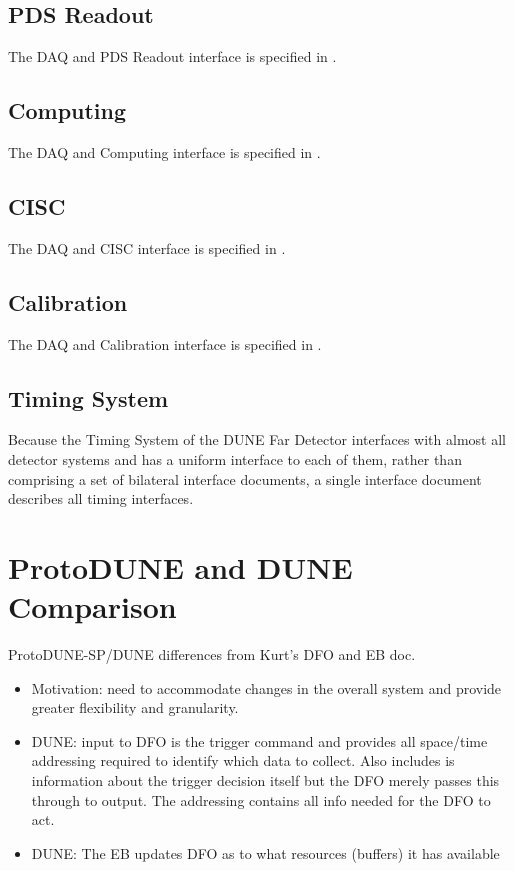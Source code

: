 \subsection{PDS Readout}
The DAQ and PDS Readout interface is specified in \cite{docid-6727}.
\subsection{Computing}
The DAQ and Computing interface is specified in \cite{docid-7123}.
\subsection{CISC}
\label{sec:sp-daq:interfaces-cisc}
The DAQ and CISC interface is specified in \cite{docid-6790}.
\subsection{Calibration}
The DAQ and Calibration interface is specified in \cite{docid-7069}.
\subsection{Timing System}
Because the Timing System of the DUNE Far Detector interfaces with
almost all detector systems and has a uniform interface to each of
them, rather than comprising a set of 
bilateral interface documents, a single interface document
\cite{docid-11224} describes all timing interfaces. 

\section{ProtoDUNE and DUNE Comparison}


ProtoDUNE-SP/DUNE differences from Kurt's DFO and EB doc.
\begin{itemize}
\item Motivation: need to accommodate changes in the overall system and provide greater flexibility and granularity.
\item DUNE: input to DFO is the trigger command and provides all space/time addressing required to identify which data to collect.  Also includes is information about the trigger decision itself but the DFO merely passes this through to output.  The addressing contains all info needed for the DFO to act.
\item DUNE: The EB updates DFO as to what resources (buffers) it has available
\end{itemize}


